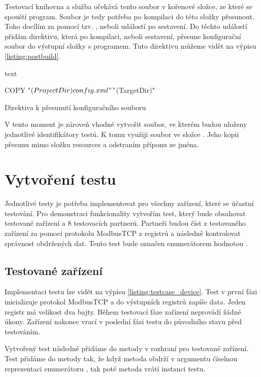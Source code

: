 Testovací knihovna a služba očekává tento soubor v kořenové složce, ze které se spouští program. Soubor je tedy potřeba po kompilaci do této složky přesunout. Toho docílím za pomocí tzv. , neboli událostí po sestavení. Do těchto událostí přidám direktivu, která po kompilaci, neboli sestavení, přesune konfigurační soubor do výstupní složky s programem. Tuto direktivu můžeme vidět na výpisu \ref{listing:postbuild}.

\begin{listing}[htbp]
    \centering
    \begin{cminted}[breaklines,stripnl=false]{text}

COPY "$(ProjectDir)config.xml"  "$(TargetDir)"

    \end{cminted}
\caption{Direktiva k přesunutí konfiguračního souboru}
\label{listing:postbuild}
\end{listing}

V tento moment je zároveň vhodné vytvořit soubor, ve kterém budou uloženy jednotlivé identifikátory testů. K tomu využiji soubor  ve složce . Jeho kopii přesunu mimo složku resources a odstraním příponu  ze jména. 

\section{Vytvoření testu}
Jednotlivé testy je potřeba implementovat pro všechny zařízení, které se účastní testování. Pro demonstraci funkcionality vytvořím test, který bude obsahovat testované zařízení a 8 testovacích partnerů. Partneři budou číst z testovaného zařízení za pomoci protokolu ModbusTCP z registrů a následně kontrolovat správnost obdržených dat. Tento test bude označen enumerátorem  hodnotou .


\subsection{Testované zařízení}
Implementaci testu lze vidět na výpisu \ref{listing:testcase_device}. Test v první fázi inicializuje protokol ModbusTCP a do výstupních registrů zapíše data. Jeden registr má velikost dva bajty. Během testovací fáze zařízení neprovádí žádné úkony. Zařízení nakonec vrací v poslední fázi testu do původního stavu před testováním.

Vytvořený test následně přidáme do metody  v rozhraní pro testované zařízení. Test přidáme do metody tak, že když metoda obdrží v argumentu číselnou reprezentaci enumerátoru , tak poté metoda vrátí instanci testu.


